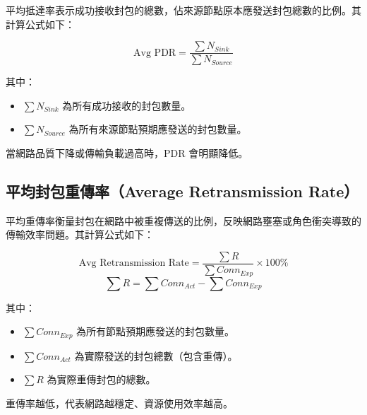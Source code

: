 \begin{ZhChapter}
平均抵達率表示成功接收封包的總數，佔來源節點原本應發送封包總數的比例。其計算公式如下：

\begin{equation}
\text{Avg PDR} = \frac{\sum N_{Sink}}{\sum N_{Source}}
\end{equation}

其中：
\begin{itemize}
    \item $\sum N_{Sink}$ 為所有成功接收的封包數量。
    \item $\sum N_{Source}$ 為所有來源節點預期應發送的封包數量。
\end{itemize}

當網路品質下降或傳輸負載過高時，PDR 會明顯降低。

\subsection{平均封包重傳率（Average Retransmission Rate）}

平均重傳率衡量封包在網路中被重複傳送的比例，反映網路壅塞或角色衝突導致的傳輸效率問題。其計算公式如下：

\begin{equation}
\text{Avg Retransmission Rate} = \frac{\sum R}{\sum Conn_{Exp}} \times 100\%
\end{equation}
\begin{equation}
\sum R = \sum Conn_{Act} - \sum Conn_{Exp}
\end{equation}

其中：
\begin{itemize}
    \item $\sum Conn_{Exp}$ 為所有節點預期應發送的封包數量。
    \item $\sum Conn_{Act}$ 為實際發送的封包總數（包含重傳）。
    \item $\sum R$ 為實際重傳封包的總數。
\end{itemize}

重傳率越低，代表網路越穩定、資源使用效率越高。



\end{ZhChapter}